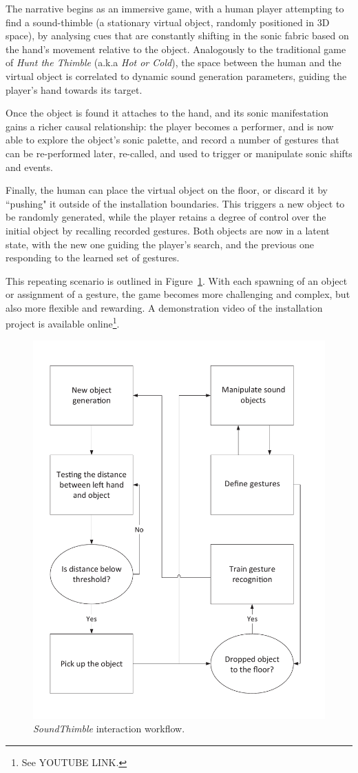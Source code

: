 The narrative begins as an immersive game, with a human player attempting to find a sound-thimble (a stationary virtual object, randomly positioned in 3D space), by analysing cues that are constantly shifting in the sonic fabric based on the hand's movement relative to the object. Analogously to the traditional game of \textit{Hunt the Thimble} (a.k.a \textit{Hot or Cold}), the space between the human and the virtual object is correlated to dynamic sound generation parameters, guiding the player's hand towards its target.

Once the object is found it attaches to the hand, and its sonic manifestation gains a richer causal relationship: the player becomes a performer, and is now able to explore the object's sonic palette, and record a number of gestures that can be re-performed later, re-called, and used to trigger or manipulate sonic shifts and events.

Finally, the human can place the virtual object on the floor, or discard it by ``pushing" it outside of the installation boundaries. This triggers a new object to be randomly generated, while the player retains a degree of control over the initial object by recalling recorded gestures. Both objects are now in a latent state, with the new one guiding the player's search, and the previous one responding to the learned set of gestures.

This repeating scenario is outlined in Figure~\ref{fig:concept}. %
With each spawning of an object or assignment of a gesture, the game becomes more challenging and complex, but also more flexible and rewarding. A demonstration video of the installation project is available online\footnote{See YOUTUBE LINK.}.


\begin{figure}[t]
	\centering
	\includegraphics[width=.65\columnwidth, clip, trim={0 .55cm 0 0}]{img/concept}
	\caption{\textit{SoundThimble} interaction workflow.}
	\label{fig:concept}
\end{figure}

